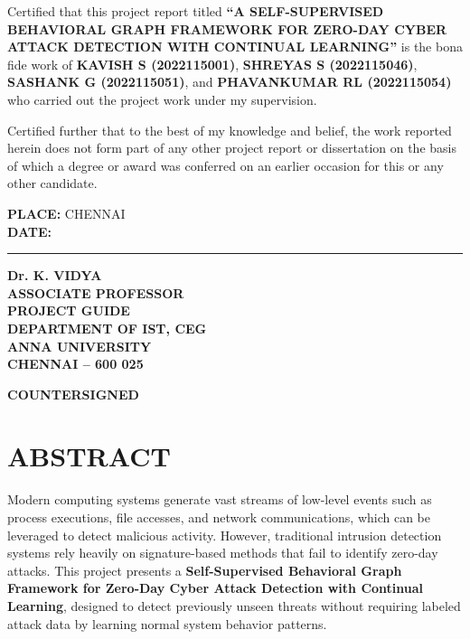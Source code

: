 \documentclass[12pt,a4paper]{report}
\numberwithin{algorithm}{chapter}
\begin{document}
\justifying
Certified that this project report titled \textbf{``A SELF-SUPERVISED BEHAVIORAL
GRAPH FRAMEWORK FOR ZERO-DAY CYBER ATTACK DETECTION WITH CONTINUAL LEARNING''} is
the bona fide work of \textbf{KAVISH S (2022115001)}, \textbf{SHREYAS S (2022115046)},
\textbf{SASHANK G (2022115051)}, and \textbf{PHAVANKUMAR RL (2022115054)} who
carried out the project work under my supervision.

Certified further that to the best of my knowledge and belief, the work reported
herein does not form part of any other project report or dissertation on the basis
of which a degree or award was conferred on an earlier occasion for this or any
other candidate.

\vspace{2cm}

\noindent
\begin{minipage}[t]{0.45\textwidth}
\textbf{PLACE:} CHENNAI\\[0.3cm]
\textbf{DATE:} \rule{3cm}{0.4pt}
\end{minipage}%
\hfill
\begin{minipage}[t]{0.5\textwidth}
\textbf{Dr. K. VIDYA}\\
\textbf{ASSOCIATE PROFESSOR}\\
\textbf{PROJECT GUIDE}\\
\textbf{DEPARTMENT OF IST, CEG}\\
\textbf{ANNA UNIVERSITY}\\
\textbf{CHENNAI -- 600 025}
\end{minipage}

\vspace{2.5cm}

\begin{center}
\textbf{COUNTERSIGNED}\\[1cm]
\end{center}
\chapter*{ABSTRACT}
\justifying

Modern computing systems generate vast streams of low-level events such as process executions, file accesses, and network communications, which can be leveraged to detect malicious activity. However, traditional intrusion detection systems rely heavily on signature-based methods that fail to identify zero-day attacks. This project presents a \textbf{Self-Supervised Behavioral Graph Framework for Zero-Day Cyber Attack Detection with Continual Learning}, designed to detect previously unseen threats without requiring labeled attack data by learning normal system behavior patterns.
\end{document}
